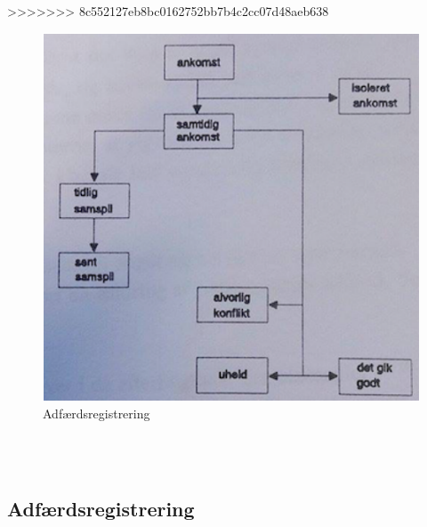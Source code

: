 >>>>>>> 8c552127eb8bc0162752bb7b4c2cc07d48aeb638
\begin{figure}[htbp]
  \label{fig:adfreg}
  \centering
  \begin{adjustbox}{max width=\textwidth}
    \includegraphics[scale=0.7]{billederogfigur/adfaerdsreg.png} %
 \end{adjustbox}
  \caption{Adfærdsregistrering}
\end{figure}
\\\
\subsection{Adfærdsregistrering}
\label{sub:adfregis}


